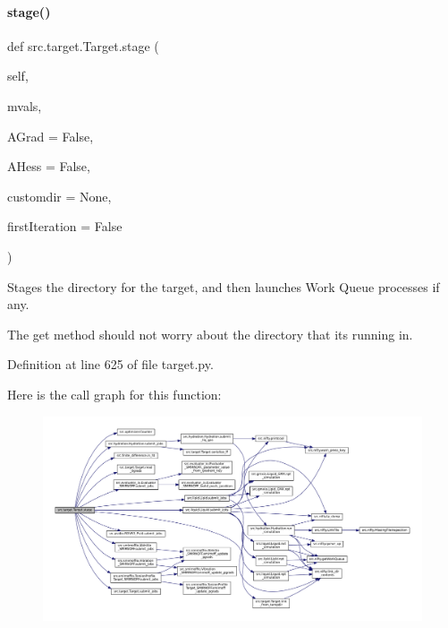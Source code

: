 \paragraph{\texorpdfstring{stage()}{stage()}}
{\footnotesize\ttfamily def src.\+target.\+Target.\+stage (\begin{DoxyParamCaption}\item[{}]{self,  }\item[{}]{mvals,  }\item[{}]{A\+Grad = {\ttfamily False},  }\item[{}]{A\+Hess = {\ttfamily False},  }\item[{}]{customdir = {\ttfamily None},  }\item[{}]{first\+Iteration = {\ttfamily False} }\end{DoxyParamCaption})\hspace{0.3cm}{\ttfamily [inherited]}}



Stages the directory for the target, and then launches Work Queue processes if any. 

The \textquotesingle{}get\textquotesingle{} method should not worry about the directory that it\textquotesingle{}s running in. 

Definition at line 625 of file target.\+py.

Here is the call graph for this function\+:
\nopagebreak
\begin{figure}[H]
\begin{center}
\leavevmode
\includegraphics[width=350pt]{classsrc_1_1target_1_1Target_af543ca7235b5112aa29018ffa7bc1e1c_cgraph}
\end{center}
\end{figure}
\mbox{\label{classsrc_1_1target_1_1RemoteTarget_ac70aab68b1b0782e053d522dc908eb05}} 
